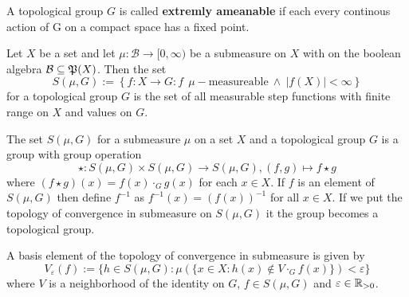 \begin{defin}
  A topological group $G$ is called \textbf{extremly ameanable} if each every continous action of G on a compact space has a fixed point.
\end{defin}

\begin{defin}\label{defin:sf}
  Let $X$ be a set and let $\mu\colon \mathcal{B} \to [0, \infty)$ be a submeasure on $X$ with on the boolean algebra $\mathcal{B} \subseteq \mathfrak{P}(X)$. Then the set
  \begin{equation*}
    S(\mu, G) := \left\{ f: X \to G\colon f \:\:\mu-\text{measureable} \: \land \: \left| f(X) \right| < \infty \right\}
  \end{equation*}
  for a topological group $G$ is the set of all measurable step functions with finite range on $X$ and values on $G$.
\end{defin}

\begin{thm}\label{thm:stop}
  The set $S(\mu, G)$ for a submeasure $\mu$ on a set $X$ and a topological group $G$ is a group with group operation
  \begin{equation*}
    \star\colon S(\mu, G) \times S(\mu, G) \to S(\mu, G), (f, g) \mapsto f \star g
  \end{equation*}
  where $(f\star g)(x) = f(x) \cdot_G g(x)$ for each $x \in X$. If $f$ is an element of $S(\mu, G)$ then define $f^{-1}$ as $f^{-1}(x) = (f(x))^{-1}$ for all $x \in X$. If we put the topology of convergence in submeasure on $S(\mu, G)$ it the group
  becomes a topological group.

  A basis element of the topology of convergence in submeasure is given by
  \begin{equation*}
    V_\varepsilon(f) := \{ h \in S(\mu, G)\colon \mu(\{x \in X\colon h(x) \notin V\cdot_G f(x)\}) < \varepsilon \}
  \end{equation*}
  where $V$ is a neighborhood of the identity on $G$, $f \in S(\mu, G)$ and $\varepsilon \in \mathbb{R}_{>0}$.
\end{thm}


